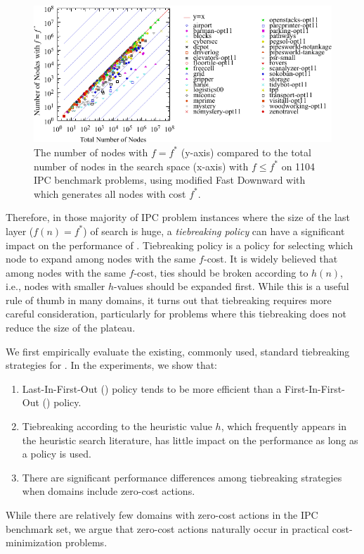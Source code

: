 \begin{figure}[htbp]
  \centering
  \includegraphics{tables/aaai16-frontier/aaai16prelim3/lmcut_frontier_noh-front.pdf}
 \caption{
 The number of nodes with $f=f^*$ (y-axis) compared to the
 total number of nodes in the search space (x-axis) with $f\leq f^*$ on 1104 IPC benchmark problems,
  using modified Fast Downward with \lmcut which 
  generates all nodes with cost $f^*$.
  }
 \label{fig:plateau-noh}
\end{figure}

Therefore, in those majority of IPC problem instances where the size of
the last layer ($f(n)=f^*$) of search is huge, a
\emph{tiebreaking policy} can have a significant impact on the
performance of \astar. Tiebreaking policy is a policy 
for selecting which node to expand among nodes with the same $f$-cost.
It is widely believed that among nodes with the same $f$-cost,
ties should be broken according to $h(n)$, i.e.,
nodes with smaller $h$-values should be expanded first.  While this is a
useful rule of thumb in many domains, it turns out that tiebreaking
requires more careful consideration, particularly for problems where
this tiebreaking does not reduce the size of the plateau.

We first empirically evaluate the existing, commonly used, standard
tiebreaking strategies for \astar.
In the experiments, we show that:
\begin{enumerate}
 \item Last-In-First-Out (\lifo) policy tends to be more efficient
       than a First-In-First-Out (\fifo) policy.
 \item Tiebreaking according to the heuristic value $h$, which
       frequently appears in the heuristic search literature, has little
       impact on the performance as long as a \lifo policy is used.
 \item There are significant performance differences among tiebreaking strategies
       when domains include zero-cost actions.
\end{enumerate}
While there are relatively few domains with zero-cost actions in the
IPC benchmark set, we argue that zero-cost actions naturally occur in 
practical cost-minimization problems.

